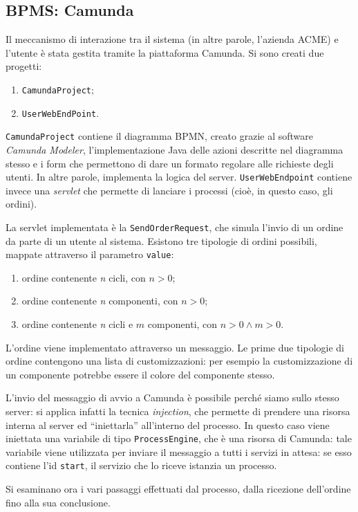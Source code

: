 \subsection{BPMS: Camunda}
Il meccanismo di interazione tra il sistema (in altre parole, l'azienda
ACME) e l'utente \`e stata gestita tramite la piattaforma Camunda.
Si sono creati due progetti:
\begin{enumerate}
  \item {\tt CamundaProject};
  \item {\tt UserWebEndPoint}.
\end{enumerate}
{\tt CamundaProject} contiene il diagramma BPMN, creato grazie al
software {\it Camunda Modeler}, l'implementazione Java delle azioni
descritte nel diagramma stesso  e i form che permettono di dare un
formato regolare alle richieste degli utenti. In altre parole,
implementa la logica del server.
{\tt UserWebEndpoint} contiene invece una {\it servlet} che permette di
lanciare i processi (cio\`e, in questo caso, gli ordini).

La servlet implementata \`e la {\tt SendOrderRequest}, che simula
l'invio di un ordine da parte di un utente al sistema. Esistono tre
tipologie di ordini possibili, mappate attraverso il parametro
{\tt value}:
\begin{enumerate}
  \item ordine contenente {\it n} cicli, con $n > 0$;
  \item ordine contenente {\it n} componenti, con $n > 0$;
  \item ordine contenente {\it n} cicli e $m$ componenti, con
  $n > 0 \land m > 0$.
\end{enumerate}
L'ordine viene implementato attraverso un messaggio.
Le prime due tipologie di ordine contengono una lista di
customizzazioni: per esempio la customizzazione di un componente
potrebbe essere il colore del componente stesso.

L'invio del messaggio di avvio a Camunda \`e possibile perch\'e siamo
sullo stesso server: si applica infatti la tecnica {\it injection}, che
permette di prendere una risorsa interna al server ed ``iniettarla''
all'interno del processo.
In questo caso viene iniettata una variabile di tipo
{\tt ProcessEngine}, che \`e una risorsa di Camunda: tale variabile
viene utilizzata per inviare il messaggio a tutti i servizi in attesa:
se esso contiene l'id {\tt start}, il servizio che lo riceve istanzia un
processo.

Si esaminano ora i vari passaggi effettuati dal processo, dalla
ricezione \linebreak dell'ordine fino alla sua conclusione.

